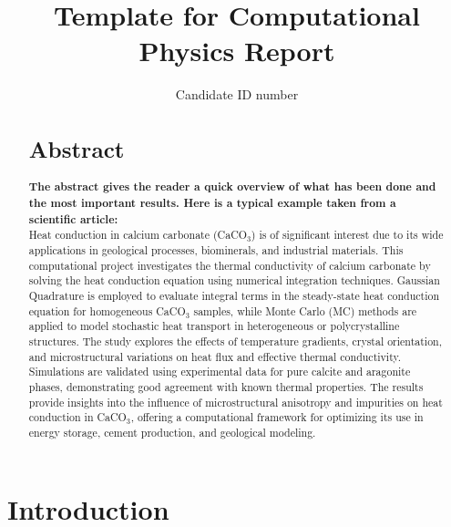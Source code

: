 \documentclass[aip,reprint]{revtex4-1}
\begin{document}
\preprint{}

\title{Template for Computational Physics Report}

\author{Candidate ID number}

\begin{abstract} 
\section*{Abstract}
\textbf{The abstract gives the reader a quick overview of what has been done and the most important results. Here is a typical example taken from a scientific article:}
\\
Heat conduction in calcium carbonate (CaCO$_3$) is of significant interest due to its wide applications in geological processes, biominerals, and industrial materials. This computational project investigates the thermal conductivity of calcium carbonate by solving the heat conduction equation using numerical integration techniques. Gaussian Quadrature is employed to evaluate integral terms in the steady-state heat conduction equation for homogeneous CaCO$_3$ samples, while Monte Carlo (MC) methods are applied to model stochastic heat transport in heterogeneous or polycrystalline structures. The study explores the effects of temperature gradients, crystal orientation, and microstructural variations on heat flux and effective thermal conductivity. Simulations are validated using experimental data for pure calcite and aragonite phases, demonstrating good agreement with known thermal properties. The results provide insights into the influence of microstructural anisotropy and impurities on heat conduction in CaCO$_3$, offering a computational framework for optimizing its use in energy storage, cement production, and geological modeling.
\end{abstract}

\maketitle 


\section{Introduction}
\end{document}
